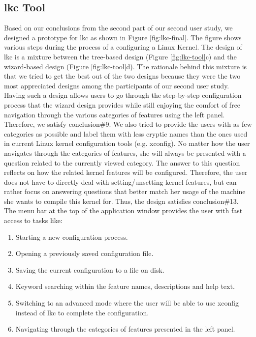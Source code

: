 \documentclass{chi2009}
\begin{document}
\subsection{\textsf{lkc} Tool}
Based on our conclusions from the second part of our second user study, we designed a prototype for \textsf{lkc} as shown in Figure \ref{fig:lkc-final}. The
figure shows various steps during the process of a configuring a Linux Kernel. The design of \textsf{lkc} is a mixture between the tree-based design (Figure
\ref{fig:lkc-tool}c) and the wizard-based design (Figure \ref{fig:lkc-tool}d). The rationale behind this mixture is that we tried to get the best out of the two
designs because they were the two most appreciated designs among the participants of our second user study. Having such a design allows users to go through the
step-by-step configuration process that the wizard design provides while still enjoying the comfort of free navigation through the various categories of
features using the left panel. Therefore, we satisfy conclusion\#9. We also tried to provide the users with as few categories as possible and label them with
less cryptic names than the ones used in current Linux kernel configuration tools (e.g. \textsf{xconfig}). No matter how the user navigates through the
categories of features, she will always be presented with a question related to the currently viewed category. The answer to this question reflects on how the
related kernel features will be configured. Therefore, the user does not have to directly deal with setting/unsetting kernel features, but can rather focus on
answering questions that better match her usage of the machine she wants to compile this kernel for. Thus, the design satisfies conclusion\#13. The menu bar at
the top of the application window provides the user with fast access to tasks like:
\begin{enumerate}
 \item Starting a new configuration process.
 \item Opening a previously saved configuration file.
 \item Saving the current configuration to a file on disk.
 \item Keyword searching within the feature names, descriptions and help text.
 \item Switching to an advanced mode where the user will be able to use \textsf{xconfig} instead of \textsf{lkc} to complete the configuration.
 \item Navigating through the categories of features presented in the left panel.
\end{enumerate}
\end{document}
